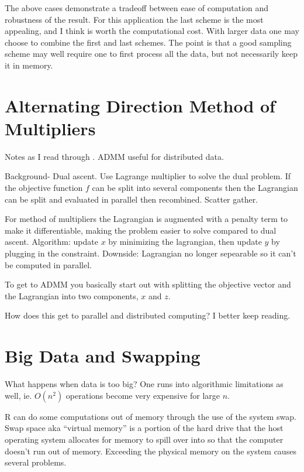 \documentclass[12pt]{article}
\begin{document}
The above cases demonstrate a tradeoff between ease of computation and
robustness of the result. For this application the last
scheme is the most appealing, and I think is worth the computational cost.
With larger data one may choose to combine the first and last schemes.  The
point is that a good sampling scheme may well require one to first process
all the data, but not necessarily keep it in memory.


\section{Alternating Direction Method of Multipliers}

Notes as I read through \cite{boyd2011distributed}. ADMM useful for distributed
data.

Background- Dual ascent. Use Lagrange multiplier to solve the dual problem.
If the objective function $f$ can be split into several components then the
Lagrangian can be split and evaluated in parallel then recombined. Scatter
gather.

For method of multipliers the Lagrangian is augmented with a penalty term
to make it differentiable, making the problem easier to solve compared to
dual ascent. Algorithm: update $x$ by minimizing the lagrangian, then
update $y$ by plugging in the constraint. Downside: Lagrangian no longer
sepearable so it can't be computed in parallel.

To get to ADMM you basically start out with splitting the objective vector
and the Lagrangian into two components, $x$ and $z$.

How does this get to parallel and distributed computing? I better keep
reading.

\section{Big Data and Swapping}

What happens when data is too big? One runs into algorithmic limitations as
well, ie. $O(n^2)$ operations become very expensive for large $n$.

R can do some computations out of memory through the use of the system
swap. Swap space aka ``virtual memory'' is a portion of the hard drive that
the host operating system allocates for memory to spill over into so that
the computer doesn't run out of memory.  Exceeding the physical memory on
the system causes several problems.
\end{document}
